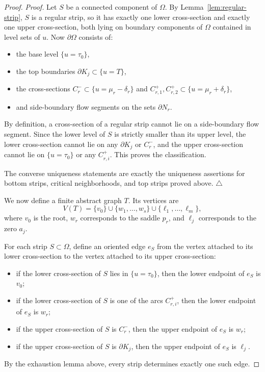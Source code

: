 \documentclass[12pt]{amsart}
\theoremstyle{definition}
\theoremstyle{remark}
\begin{document}
\begin{proof}
\smallskip
\noindent\emph{Proof.}
Let $S$ be a connected component of $\Omega$. By Lemma~\ref{lem:regular-strip}, $S$ is a regular strip,
so it has exactly one lower cross-section and exactly one upper cross-section, both lying
on boundary components of $\Omega$ contained in level sets of $u$.
Now $\partial\Omega$ consists of:
\begin{itemize}
\item the base level $\{u=\tau_0\}$,
\item the top boundaries $\partial K_j\subset\{u=T\}$,
\item the cross-sections $C_r^-\subset\{u=\mu_r-\delta_r\}$ and
      $C_{r,1}^+,C_{r,2}^+\subset\{u=\mu_r+\delta_r\}$,
\item and side-boundary flow segments on the sets $\partial N_r$.
\end{itemize}
By definition, a cross-section of a regular strip cannot lie on a side-boundary flow
segment. Since the lower level of $S$ is strictly smaller than its upper level, the lower
cross-section cannot lie on any $\partial K_j$ or $C_r^-$, and the upper cross-section
cannot lie on $\{u=\tau_0\}$ or any $C_{r,i}^+$. This proves the classification.

The converse uniqueness statements are exactly the uniqueness assertions for
bottom strips, critical neighborhoods, and top strips proved above.
\hfill$\triangle$

We now define a finite abstract graph $T$. Its vertices are
\[
V(T)=\{v_0\}\cup\{w_1,\dots,w_s\}\cup\{\ell_1,\dots,\ell_m\},
\]
where $v_0$ is the root, $w_r$ corresponds to the saddle $p_r$, and $\ell_j$
corresponds to the zero $a_j$.

For each strip $S\subset\Omega$, define an oriented edge $e_S$ from the vertex attached
to its lower cross-section to the vertex attached to its upper cross-section:
\begin{itemize}
\item if the lower cross-section of $S$ lies in $\{u=\tau_0\}$, then the lower endpoint
      of $e_S$ is $v_0$;
\item if the lower cross-section of $S$ is one of the arcs $C_{r,i}^+$, then the lower
      endpoint of $e_S$ is $w_r$;
\item if the upper cross-section of $S$ is $C_r^-$, then the upper endpoint of $e_S$ is
      $w_r$;
\item if the upper cross-section of $S$ is $\partial K_j$, then the upper endpoint of
      $e_S$ is $\ell_j$.
\end{itemize}
By the exhaustion lemma above, every strip determines exactly one such edge.


\end{proof}
\end{document}
